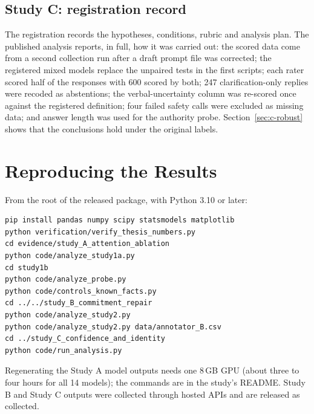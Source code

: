 \documentclass[11pt,a4paper,oneside]{report}
\begin{document}
\section{Study C: registration record}
The registration records the hypotheses, conditions, rubric and analysis plan. The published analysis reports, in full, how it was carried out: the scored data come from a second collection run after a draft prompt file was corrected; the registered mixed models replace the unpaired tests in the first scripts; each rater scored half of the responses with 600 scored by both; 247 clarification-only replies were recoded as abstentions; the verbal-uncertainty column was re-scored once against the registered definition; four failed safety calls were excluded as missing data; and answer length was used for the authority probe. Section~\ref{sec:c-robust} shows that the conclusions hold under the original labels.

\chapter{Reproducing the Results}
\label{app:repro}
From the root of the released package, with Python 3.10 or later:
\begin{verbatim}
pip install pandas numpy scipy statsmodels matplotlib
python verification/verify_thesis_numbers.py
cd evidence/study_A_attention_ablation
python code/analyze_study1a.py
cd study1b
python code/analyze_probe.py
python code/controls_known_facts.py
cd ../../study_B_commitment_repair
python code/analyze_study2.py
python code/analyze_study2.py data/annotator_B.csv
cd ../study_C_confidence_and_identity
python code/run_analysis.py
\end{verbatim}
Regenerating the Study A model outputs needs one 8\,GB GPU (about three to four hours for all 14 models); the commands are in the study's README. Study B and Study C outputs were collected through hosted APIs and are released as collected.
\end{document}
